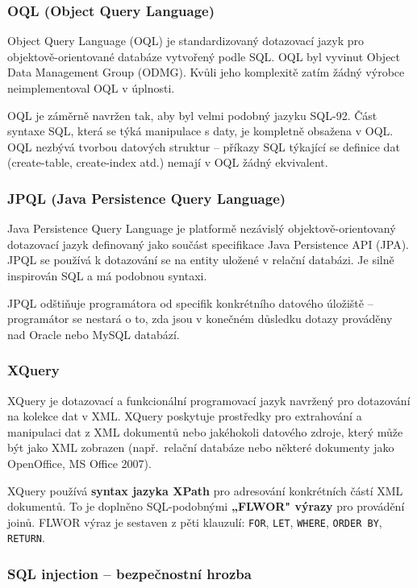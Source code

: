 \documentclass[12pt,a4paper]{article}
\begin{document}
\subsubsection{OQL (Object Query Language)}

Object Query Language (OQL) je standardizovaný dotazovací jazyk pro objektově-orientované databáze
vytvořený podle SQL. OQL byl vyvinut Object Data Management Group (ODMG). Kvůli jeho komplexitě
zatím žádný výrobce neimplementoval OQL v úplnosti.

OQL je záměrně navržen tak, aby byl velmi podobný jazyku SQL-92. Část syntaxe SQL, která se týká
manipulace s daty, je kompletně obsažena v OQL. OQL nezbývá tvorbou datových struktur -- příkazy
SQL týkající se definice dat (create-table, create-index atd.) nemají v OQL žádný ekvivalent.

\subsubsection{JPQL (Java Persistence Query Language)}

Java Persistence Query Language je platformě nezávislý objektově-orientovaný dotazovací jazyk
definovaný jako součást specifikace Java Persistence API (JPA). JPQL se používá k dotazování se na
entity uložené v relační databázi. Je silně inspirován SQL a má podobnou syntaxi.

JPQL odštiňuje programátora od specifik konkrétního datového úložiště -- programátor se nestará
o to, zda jsou v konečném důsledku dotazy prováděny nad Oracle nebo MySQL databází.

\subsubsection{XQuery}

XQuery je dotazovací a funkcionální programovací jazyk navržený pro dotazování na kolekce dat v XML.
XQuery poskytuje prostředky pro extrahování a manipulaci dat z XML dokumentů nebo jakéhokoli
datového zdroje, který může být jako XML zobrazen (např.\ relační databáze nebo některé dokumenty
jako OpenOffice, MS Office 2007).

XQuery používá \textbf{syntax jazyka XPath} pro adresování konkrétních částí XML dokumentů.
To je doplněno SQL-podobnými \textbf{„FLWOR" výrazy} pro provádění joinů. FLWOR výraz je sestaven
z pěti klauzulí: \texttt{FOR}, \texttt{LET}, \texttt{WHERE}, \texttt{ORDER BY}, \texttt{RETURN}.

\subsubsection{SQL injection -- bezpečnostní hrozba}
\end{document}

